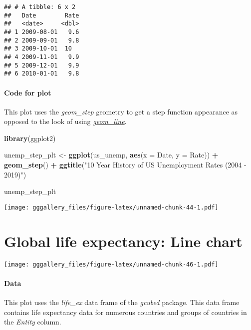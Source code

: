 \documentclass[]{book}
\newenvironment{Shaded}{\begin{snugshade}}{\end{snugshade}}
\newcommand{\DataTypeTok}[1]{\textcolor[rgb]{0.13,0.29,0.53}{#1}}
\newcommand{\KeywordTok}[1]{\textcolor[rgb]{0.13,0.29,0.53}{\textbf{#1}}}
\newcommand{\NormalTok}[1]{#1}
\newcommand{\OperatorTok}[1]{\textcolor[rgb]{0.81,0.36,0.00}{\textbf{#1}}}
\newcommand{\StringTok}[1]{\textcolor[rgb]{0.31,0.60,0.02}{#1}}
\begin{document}
\begin{verbatim}
## # A tibble: 6 x 2
##   Date        Rate
##   <date>     <dbl>
## 1 2009-08-01   9.6
## 2 2009-09-01   9.8
## 3 2009-10-01  10  
## 4 2009-11-01   9.9
## 5 2009-12-01   9.9
## 6 2010-01-01   9.8
\end{verbatim}

\hypertarget{unemppppcode}{%
\subsubsection*{Code for plot}\label{unemppppcode}}

This plot uses the \emph{geom\_step} geometry to get a step function appearance as opposed to the look of using \protect\hyperlink{unemp1code}{\emph{geom\_line}}.

\begin{Shaded}
\begin{Highlighting}[]
\KeywordTok{library}\NormalTok{(ggplot2)}

\NormalTok{unemp_step_plt <-}\StringTok{ }\KeywordTok{ggplot}\NormalTok{(us_unemp, }\KeywordTok{aes}\NormalTok{(}\DataTypeTok{x =}\NormalTok{ Date, }\DataTypeTok{y =}\NormalTok{ Rate)) }\OperatorTok{+}\StringTok{ }\KeywordTok{geom_step}\NormalTok{() }\OperatorTok{+}\StringTok{ }
\StringTok{  }\KeywordTok{ggtitle}\NormalTok{(}\StringTok{"10 Year History of US Unemployment Rates (2004 - 2019)"}\NormalTok{)}
  
  
\NormalTok{unemp_step_plt}
\end{Highlighting}
\end{Shaded}

\texttt{[image: gggallery\_files/figure-latex/unnamed-chunk-44-1.pdf]}

\hypertarget{lex}{%
\chapter*{Global life expectancy: Line chart}\label{lex}}

\texttt{[image: gggallery\_files/figure-latex/unnamed-chunk-46-1.pdf]}

\hypertarget{lexdata}{%
\subsubsection*{Data}\label{lexdata}}

This plot uses the \emph{life\_ex} data frame of the \emph{gcubed} package. This data frame contains life expectancy data for numerous countries and groups of countries in the \emph{Entity} column.
\end{document}
